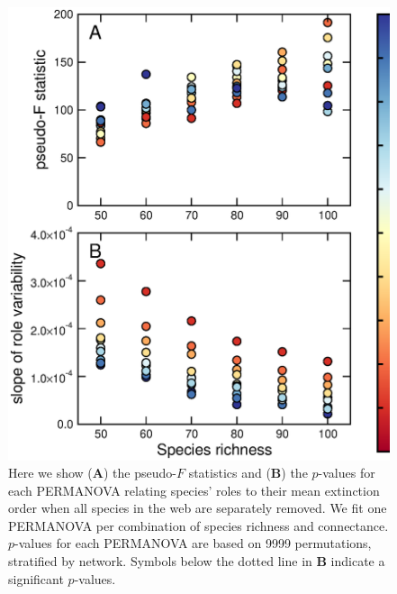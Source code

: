 \documentclass[12pt]{article}
\begin{document}
\begin{spacing}{2.0}
		\begin{figure}[h!]
			\caption{Here we show (\textbf{A}) the pseudo-$F$ statistics and (\textbf{B}) the $p$-values for each PERMANOVA relating species' roles to their mean extinction order when all species in the web are separately removed. We fit one PERMANOVA per combination of species richness and connectance. $p$-values for each PERMANOVA are based on 9999 permutations, stratified by network. Symbols below the dotted line in \textbf{B} indicate a significant $p$-values. }
			\label{permfig}
			\includegraphics[height=.5\textheight]{figures/extinction_order/permanova_summary_paper_full.eps}
			\end{figure}



\end{spacing}
\end{document}
